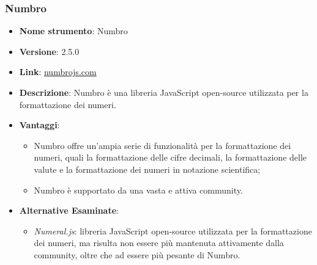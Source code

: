 \subsubsection{Numbro}
\begin{itemize}
      \item \textbf{Nome strumento}: Numbro
      \item \textbf{Versione}: 2.5.0
      \item \textbf{Link}: \href{http://numbrojs.com/}{numbrojs.com}
      \item \textbf{Descrizione}: Numbro è una libreria JavaScript open-source utilizzata per la formattazione dei numeri.
      \item \textbf{Vantaggi}:
            \begin{itemize}
                  \item Numbro offre un'ampia serie di funzionalità per la formattazione dei numeri, quali la formattazione delle cifre decimali, la formattazione delle valute
                        e la formattazione dei numeri in notazione scientifica;
                  \item Numbro è supportato da una vasta e attiva community.
            \end{itemize}
      \item \textbf{Alternative Esaminate}:
            \begin{itemize}
                  \item \textit{Numeral.js}: libreria JavaScript open-source utilizzata per la formattazione dei numeri, ma risulta non essere più mantenuta attivamente dalla community, oltre
                        che ad essere più pesante di Numbro.
            \end{itemize}
\end{itemize}

